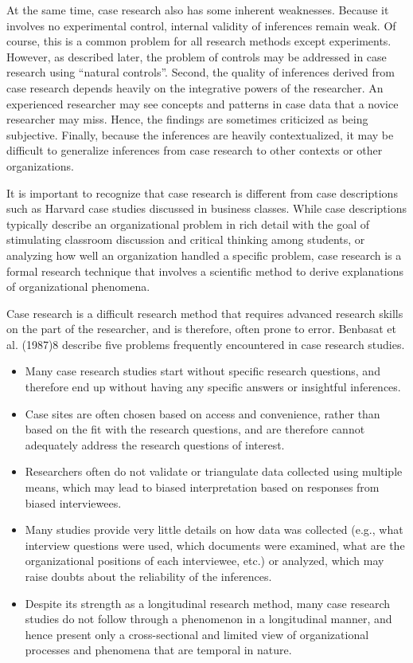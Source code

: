 At the same time, case research also has some inherent weaknesses. Because it involves no experimental control, internal validity of inferences remain weak. Of course, this is a common problem for all research methods except experiments. However, as described later, the problem of controls may be addressed in case research using ``natural controls''. Second, the quality of inferences derived from case research depends heavily on the integrative powers of the researcher. An experienced researcher may see concepts and patterns in case data that a novice researcher may miss. Hence, the findings are sometimes criticized as being subjective. Finally, because the inferences are heavily contextualized, it may be difficult to generalize inferences from case research to other contexts or other organizations.

It is important to recognize that case research is different from case descriptions such as Harvard case studies discussed in business classes. While case descriptions typically describe an organizational problem in rich detail with the goal of stimulating classroom discussion and critical thinking among students, or analyzing how well an organization handled a specific problem, case research is a formal research technique that involves a scientific method to derive explanations of organizational phenomena.

Case research is a difficult research method that requires advanced research skills on the part of the researcher, and is therefore, often prone to error. Benbasat et al. (1987)8 describe five problems frequently encountered in case research studies.

\begin{itemize}
	\item Many case research studies start without specific research questions, and therefore end up without having any specific answers or insightful inferences.
	\item Case sites are often chosen based on access and convenience, rather than based on the fit with the research questions, and are therefore cannot adequately address the research questions of interest.
	\item Researchers often do not validate or triangulate data collected using multiple means, which may lead to biased interpretation based on responses from biased interviewees.
	\item Many studies provide very little details on how data was collected (e.g., what interview questions were used, which documents were examined, what are the organizational positions of each interviewee, etc.) or analyzed, which may raise doubts about the reliability of the inferences.
	\item Despite its strength as a longitudinal research method, many case research studies do not follow through a phenomenon in a longitudinal manner, and hence present only a cross-sectional and limited view of organizational processes and phenomena that are temporal in nature.
\end{itemize}

